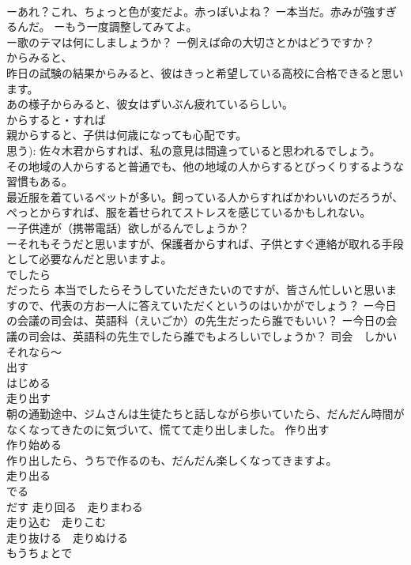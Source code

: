 \documentclass[8pt]{extreport}
\begin{document}
\begin{CJK}{UTF8}{min}
\\	ーあれ？これ、ちょっと色が変だよ。赤っぽいよね？ ー本当だ。赤みが強すぎるんだ。 ーもう一度調整してみてよ。
\\	ー歌のテマは何にしましょうか？ ー例えば命の大切さとかはどうですか？
\\	からみると、	
\\	昨日の試験の結果からみると、彼はきっと希望している高校に合格できると思います。 
\\	あの様子からみると、彼女はずいぶん疲れているらしい。 
\\	からすると・すれば 
\\	親からすると、子供は何歳になっても心配です。 
\\	思う): 佐々木君からすれば、私の意見は間違っていると思われるでしょう。 
\\	その地域の人からすると普通でも、他の地域の人からするとびっくりするような習慣もある。 
\\	最近服を着ているペットが多い。飼っている人からすればかわいいのだろうが、ぺっとからすれば、服を着せられてストレスを感じているかもしれない。 
\\	ー子供達が（携帯電話）欲しがるんでしょうか？　
\\	ーそれもそうだと思いますが、保護者からすれば、子供とすぐ連絡が取れる手段として必要なんだと思いますよ。
\\	でしたら	
\\	だったら 本当でしたらそうしていただきたいのですが、皆さん忙しいと思いますので、代表の方お一人に答えていただくというのはいかがでしょう？ ー今日の会議の司会は、英語科（えいごか）の先生だったら誰でもいい？ ー今日の会議の司会は、英語科の先生でしたら誰でもよろしいでしょうか？ 司会　しかい　
\\	それなら～ 
\\	出す	
\\	はじめる 
\\	走り出す　　
\\	朝の通勤途中、ジムさんは生徒たちと話しながら歩いていたら、だんだん時間がなくなってきたのに気づいて、慌てて走り出しました。 作り出す　　
\\	作り始める 
\\	作り出したら、うちで作るのも、だんだん楽しくなってきますよ。　
\\	走り出る　
\\	でる 
\\	だす 走り回る　走りまわる 
\\	走り込む　走りこむ 
\\	走り抜ける　走りぬける 
\\	もうちょとで

\end{CJK}
\end{document}
